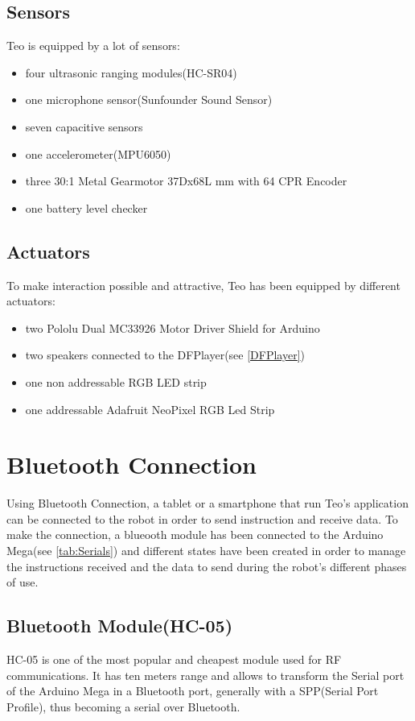 \subsection{Sensors}
Teo is equipped by a lot of sensors:
\begin{itemize}
	\item four ultrasonic ranging modules(HC-SR04)
	\item one microphone sensor(Sunfounder Sound Sensor)
	\item seven capacitive sensors
	\item one accelerometer(MPU6050)
	\item three 30:1 Metal Gearmotor 37Dx68L mm with 64 CPR Encoder
	\item one battery level checker
\end{itemize}







\subsection{Actuators}
To make interaction possible and attractive, Teo has been equipped by different actuators:
\begin{itemize}
	\item two Pololu Dual MC33926 Motor Driver Shield for Arduino
	\item two speakers connected to the DFPlayer(see \ref{DFPlayer})
	\item one non addressable RGB LED strip
	\item one addressable Adafruit NeoPixel RGB Led Strip
\end{itemize}
\section{Bluetooth Connection}
Using Bluetooth Connection, a tablet or a smartphone that run Teo's application can be connected to the robot in order to send instruction and receive data. To make the connection, a blueooth module has been connected to the Arduino Mega(see \ref{tab:Serials}) and different states have been created in order to manage the instructions received and the data to send during the robot's different phases of use. 

\subsection{Bluetooth Module(HC-05)}
HC-05 is one of the most popular and cheapest module used for RF communications. It has ten meters range and allows to transform the Serial port of the Arduino Mega in a Bluetooth port, generally with a SPP(Serial Port Profile), thus becoming a serial over Bluetooth. 

